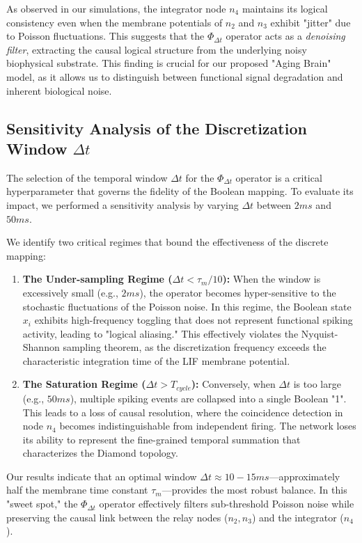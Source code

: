 \documentclass[10pt, conference]{IEEEtran}
\begin{document}
As observed in our simulations, the integrator node $n_4$ maintains its logical consistency even when the membrane potentials of $n_2$ and $n_3$ exhibit "jitter" due to Poisson fluctuations. This suggests that the $\Phi_{\Delta t}$ operator acts as a \textit{denoising filter}, extracting the causal logical structure from the underlying noisy biophysical substrate. This finding is crucial for our proposed "Aging Brain" model, as it allows us to distinguish between functional signal degradation and inherent biological noise.

\subsection{Sensitivity Analysis of the Discretization Window $\Delta t$}

The selection of the temporal window $\Delta t$ for the $\Phi_{\Delta t}$ operator is a critical hyperparameter that governs the fidelity of the Boolean mapping. To evaluate its impact, we performed a sensitivity analysis by varying $\Delta t$ between $2ms$ and $50ms$. 

We identify two critical regimes that bound the effectiveness of the discrete mapping:

\begin{enumerate}
    \item \textbf{The Under-sampling Regime ($\Delta t < \tau_m/10$):} When the window is excessively small (e.g., $2ms$), the operator becomes hyper-sensitive to the stochastic fluctuations of the Poisson noise. In this regime, the Boolean state $x_i$ exhibits high-frequency toggling that does not represent functional spiking activity, leading to "logical aliasing." This effectively violates the Nyquist-Shannon sampling theorem, as the discretization frequency exceeds the characteristic integration time of the LIF membrane potential.
    
    \item \textbf{The Saturation Regime ($\Delta t > T_{cycle}$):} Conversely, when $\Delta t$ is too large (e.g., $50ms$), multiple spiking events are collapsed into a single Boolean "1". This leads to a loss of causal resolution, where the coincidence detection in node $n_4$ becomes indistinguishable from independent firing. The network loses its ability to represent the fine-grained temporal summation that characterizes the Diamond topology.
\end{enumerate}

Our results indicate that an optimal window $\Delta t \approx 10-15ms$—approximately half the membrane time constant $\tau_m$—provides the most robust balance. In this "sweet spot," the $\Phi_{\Delta t}$ operator effectively filters sub-threshold Poisson noise while preserving the causal link between the relay nodes ($n_2, n_3$) and the integrator ($n_4$).
\end{document}
